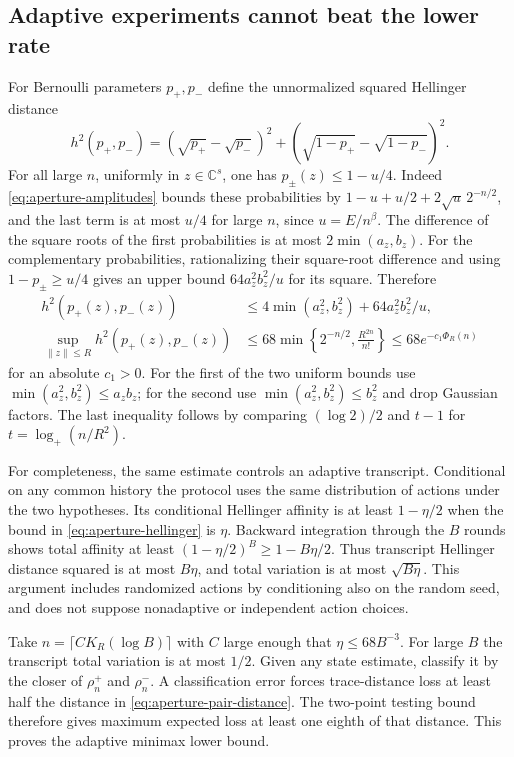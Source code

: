 \subsection{Adaptive experiments cannot beat the lower rate}
For Bernoulli parameters $p_+,p_-$ define the unnormalized squared Hellinger
distance
\[
 h^2(p_+,p_-)=(\sqrt{p_+}-\sqrt{p_-})^2
                  +(\sqrt{1-p_+}-\sqrt{1-p_-})^2.
\]
For all large $n$, uniformly in $z\in\mathbb C^s$, one has
$p_\pm(z)\le1-u/4$. Indeed \eqref{eq:aperture-amplitudes} bounds these
probabilities by $1-u+u/2+2\sqrt u\,2^{-n/2}$, and the last term is at most
$u/4$ for large $n$, since $u=E/n^\beta$.
The difference of the square roots of the first probabilities is at most
$2\min(a_z,b_z)$. For the complementary probabilities, rationalizing their
square-root difference and using $1-p_\pm\ge u/4$ gives an upper bound
$64a_z^2b_z^2/u$ for its square. Therefore
\begin{align}
 h^2(p_+(z),p_-(z))
 &\le4\min(a_z^2,b_z^2)+64a_z^2b_z^2/u,\nonumber\\
 \sup_{\|z\|\le R}h^2(p_+(z),p_-(z))
 &\le68\min\left\{2^{-n/2},\frac{R^{2n}}{n!}\right\}
 \le68e^{-c_1\Phi_R(n)}
 \tag{A.18}\label{eq:aperture-hellinger}
\end{align}
for an absolute $c_1>0$. For the first of the two uniform bounds use
$\min(a_z^2,b_z^2)\le a_zb_z$; for the second use
$\min(a_z^2,b_z^2)\le b_z^2$ and drop Gaussian factors.
The last inequality follows by comparing
$(\log2)/2$ and $t-1$ for $t=\log_+(n/R^2)$.

For completeness, the same estimate controls an adaptive transcript.
Conditional on any common history the protocol uses the same distribution
of actions under the two hypotheses. Its conditional Hellinger affinity is
at least $1-\eta/2$ when the bound in \eqref{eq:aperture-hellinger} is $\eta$.
Backward integration through the $B$ rounds shows total affinity at least
$(1-\eta/2)^B\ge1-B\eta/2$. Thus transcript Hellinger distance squared is
at most $B\eta$, and total variation is at most $\sqrt{B\eta}$.
This argument includes randomized actions by conditioning also on the random
seed, and does not suppose nonadaptive or independent action choices.

Take $n=\lceil C K_R(\log B)\rceil$ with $C$ large enough that
$\eta\le68B^{-3}$. For large $B$ the transcript total variation is at most
$1/2$. Given any state estimate, classify it by the closer of
$\rho_n^+$ and $\rho_n^-$. A classification error forces trace-distance
loss at least half the distance in \eqref{eq:aperture-pair-distance}.
The two-point testing bound therefore gives maximum expected loss at least
one eighth of that distance. This proves the adaptive minimax lower bound.

